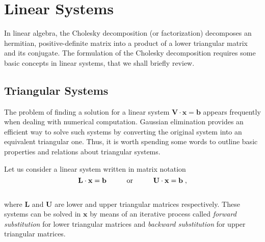 \documentclass[../main.tex]{subfiles}
\begin{document}
\newcommand{\mb}[1]{\mathbf{#1}}

\chapter{Linear Systems}
In linear algebra, the Cholesky decomposition (or factorization) decomposes an hermitian, positive-definite matrix into a product of a lower triangular matrix and its conjugate. The formulation of the Cholesky decomposition requires some basic concepts in linear systems, that we shall briefly review.

\section{Triangular Systems}
The problem of finding a solution for a linear system $\mb{V} \cdot \mb{x} = \mb{b}$ appears frequently when dealing with numerical computation. Gaussian elimination provides an efficient way to solve such systems by converting the  original system into an equivalent triangular one. Thus, it is worth spending some words to outline basic properties and relations about triangular systems.\par
Let us consider a linear system written in matrix notation
\\
\begin{equation}
    \mb{L} \cdot \mb{x} = \mb{b} \hspace{10mm} \textrm{or} \hspace{10mm} \mb{U} \cdot \mb{x} = \mb{b} \; ,
\end{equation}
\\
where $\mb{L}$ and $\mb{U}$ are lower and upper triangular matrices respectively. These systems can be solved in $\mb{x}$ by means of an iterative process called \textit{forward substitution} for lower triangular matrices and \textit{backward substitution} for upper triangular matrices. 
\end{document}
